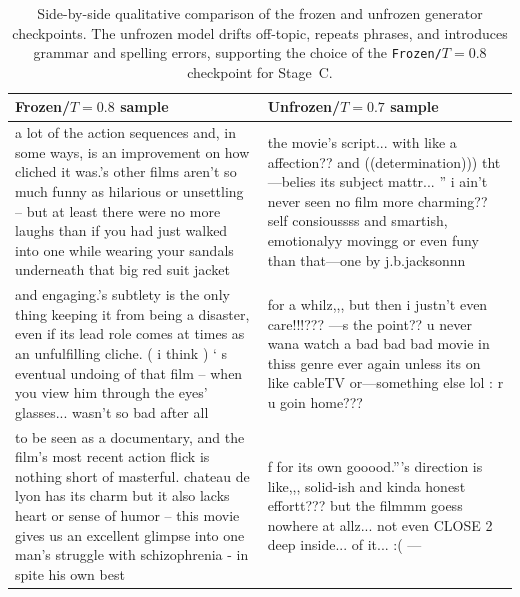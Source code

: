 \documentclass[11pt]{article}
\begin{document}
\begin{table}[htbp]
  \centering
  \renewcommand{\arraystretch}{1.15}
  \begin{tabular}{@{}p{.46\linewidth}p{.46\linewidth}@{}}
    \toprule
    \textbf{Frozen/$T=0.8$ sample} &
    \textbf{Unfrozen/$T=0.7$ sample} \\
    \midrule
    {\ttfamily%
      a lot of the action sequences and, in some ways, is an
      improvement on how cliched it
      was.'s other films aren't so much funny as hilarious or
      unsettling -- but at least there
      were no more laughs than if you had just walked into one while
      wearing your sandals
    underneath that big red suit jacket} &
    {\ttfamily%
      the movie's script... with like a affection?? and
    ((determination))) tht---belies its subject mattr... '' i ain't
    never seen no film more charming?? self consioussss and smartish,
  emotionalyy movingg or even funy than that---one by j.b.jacksonnn } \\
  \addlinespace
  {\ttfamily%
    and engaging.'s subtlety is the only thing keeping it from
    being a disaster, even if its
    lead role comes at times as an unfulfilling cliche. ( i think )
    ` s eventual undoing of
    that film -- when you view him through the eyes' glasses...
  wasn't so bad after all} &
  {\ttfamily%
    for a whilz,,, but then i justn't even care!!!??? ---s the point??
    u never wana watch a bad bad bad movie in thiss genre ever again
  unless its on like cableTV or---something else lol : r u goin home??? } \\
  \addlinespace
  {\ttfamily%
    to be seen as a documentary, and the film's most recent action
    flick is nothing short of
    masterful. chateau de lyon has its charm but it also lacks
    heart or sense of humor --
    this movie gives us an excellent glimpse into one man's
    struggle with schizophrenia -
  in spite his own best} &
  {\ttfamily%
    f for its own gooood.'''s direction is like,,, solid-ish and
    kinda honest effortt??? but the filmmm goess nowhere at allz...
    not even CLOSE 2 deep inside... of it... :( --- } \\
    \bottomrule
  \end{tabular}
  \caption{Side-by-side qualitative comparison of the frozen and unfrozen
    generator checkpoints. The unfrozen model drifts off-topic,
    repeats phrases,
    and introduces grammar and spelling errors, supporting the
    choice of the
  \texttt{Frozen/$T=0.8$} checkpoint for Stage~C.}
  \label{tab:gen-qual}
\end{table}
\end{document}
